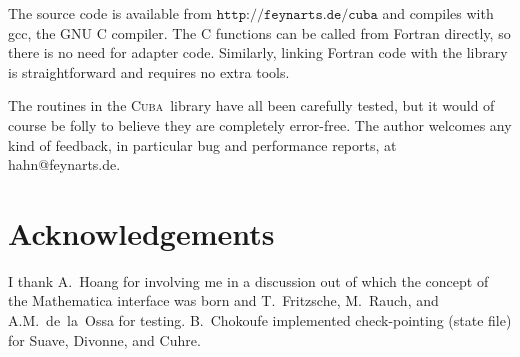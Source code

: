 \documentclass[12pt]{article}
\newcommand\cuba{\textsc{Cuba}}
\newcommand\Code[1]{\ensuremath{\texttt{#1}}}
\begin{document}
The source code is available from \Code{http://feynarts.de/cuba}
and compiles with gcc, the GNU C compiler.  The C functions can be
called from Fortran directly, so there is no need for adapter code. 
Similarly, linking Fortran code with the library is straightforward
and requires no extra tools.

The routines in the \cuba\ library have all been carefully tested, but
it would of course be folly to believe they are completely error-free. 
The author welcomes any kind of feedback, in particular bug and 
performance reports, at hahn@feynarts.de.


\section*{Acknowledgements}

I thank A.~Hoang for involving me in a discussion out of which the 
concept of the Mathematica interface was born and T.~Fritzsche, 
M.~Rauch, and A.M.~de~la~Ossa for testing.  B.~Chokoufe implemented
check-pointing (state file) for Suave, Divonne, and Cuhre.
\end{document}
